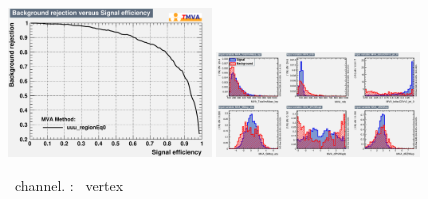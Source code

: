 \begin{figure}[htbp]
	\includegraphics[width=0.48\textwidth]{6_Search/Figures/MVAtechnics/singletopzct/uuu/rejBvsS.png}
	\includegraphics[width=0.48\textwidth]{6_Search/Figures/MVAtechnics/singletopzct/uuu/variables_id_c1.png}
	\caption{\mumumu\ channel. \STSR: \Zct\ vertex }
	\label{image:Figuresuuusingletopzct}
\end{figure}

